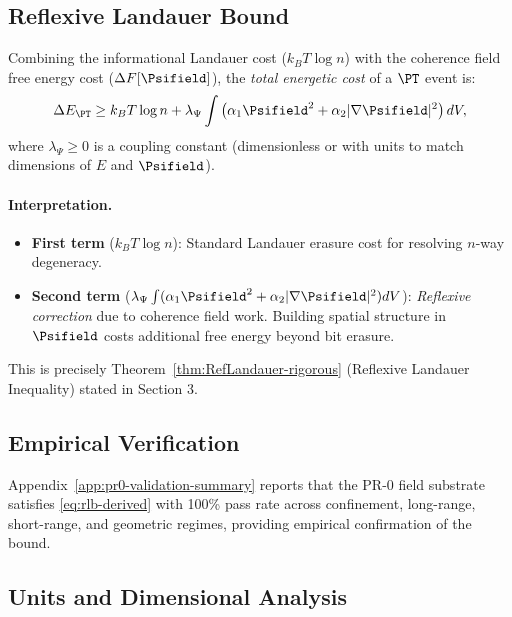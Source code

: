 \subsection{Reflexive Landauer Bound}

Combining the informational Landauer cost (\(k_B T \log n\)) with the coherence field free energy cost (\(\Delta F[\Psifield]\)), the \emph{total energetic cost} of a \(\PT\) event is:
\begin{equation}
\Delta E_{\PT} \ge k_B T \log n + \lambda_\Psi \int \left( \alpha_1 \Psifield^2 + \alpha_2 |\nabla\Psifield|^2 \right) dV,
\label{eq:rlb-derived}
\end{equation}
where \(\lambda_\Psi \ge 0\) is a coupling constant (dimensionless or with units to match dimensions of \(E\) and \(\Psifield\)).

\paragraph{Interpretation.}
\begin{itemize}[leftmargin=1.2em]
  \item \textbf{First term} (\(k_B T \log n\)): Standard Landauer erasure cost for resolving \(n\)-way degeneracy.
  \item \textbf{Second term} (\(\lambda_\Psi \int (\alpha_1 \Psifield^2 + \alpha_2 |\nabla\Psifield|^2) dV\)): \emph{Reflexive correction} due to coherence field work. Building spatial structure in \(\Psifield\) costs additional free energy beyond bit erasure.
\end{itemize}

This is precisely Theorem~\ref{thm:RefLandauer-rigorous} (Reflexive Landauer Inequality) stated in Section 3.

\subsection{Empirical Verification}

Appendix~\ref{app:pr0-validation-summary} reports that the PR-0 field substrate satisfies \eqref{eq:rlb-derived} with 100\% pass rate across confinement, long-range, short-range, and geometric regimes, providing empirical confirmation of the bound.

\subsection{Units and Dimensional Analysis}

